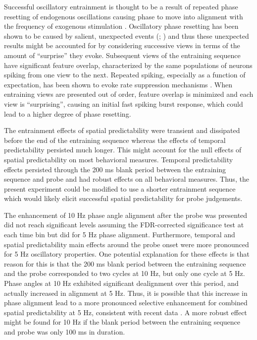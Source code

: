 \documentclass[dwyatte_dissertation.tex]{subfiles}
\begin{document}
Successful oscillatory entrainment is thought to be a result of repeated phase resetting of endogenous oscillations causing phase to move into alignment with the frequency of exogenous stimulation \cite{SchroederLakatosKajikawaEtAl08,CalderoneLakatosButlerEtAlInPress}. Oscillatory phase resetting has been shown to be caused by salient, unexpected events (; ) and thus these unexpected results might be accounted for by considering successive views in terms of the amount of ``surprise'' \cite{IttiBaldi09,MeyerOlson11} they evoke. Subsequent views of the entraining sequence have significant feature overlap, characterized by the same populations of neurons spiking from one view to the next. Repeated spiking, especially as a function of expectation, has been shown to evoke rate suppression mechanisms \cite{SummerfieldTrittschuhMontiEtAl08}. When entraining views are presented out of order, feature overlap is minimized and each view is ``surprising'', causing an initial fast spiking burst response, which could lead to a higher degree of phase resetting.

The entrainment effects of spatial predictability were transient and dissipated before the end of the entraining sequence whereas the effects of temporal predictability persisted much longer. This might account for the null effects of spatial predictability on most behavioral measures. Temporal predictability effects persisted through the 200 ms blank period between the entraining sequence and probe and had robust effects on all behavioral measures. Thus, the present experiment could be modified to use a shorter entrainment sequence which would likely elicit successful spatial predictability for probe judgements.

The enhancement of 10 Hz phase angle alignment after the probe was presented did not reach significant levels assuming the FDR-corrected significance test at each time bin but did for 5 Hz phase alignment. Furthermore, temporal and spatial predictability main effects around the probe onset were more pronounced for 5 Hz oscillatory properties. One potential explanation for these effects is that reason for this is that the 200 ms blank period between the entraining sequence and the probe corresponded to two cycles at 10 Hz, but only one cycle at 5 Hz. Phase angles at 10 Hz exhibited significant dealignment over this period, and actually increased in alignment at 5 Hz. Thus, it is possible that this increase in phase alignment lead to a more pronounced selective enhancement for combined spatial predictability at 5 Hz, consistent with recent data \cite{CravoRohenkohlWyartEtAl13}. A more robust effect might be found for 10 Hz if the blank period between the entraining sequence and probe was only 100 ms in duration.
\end{document}

